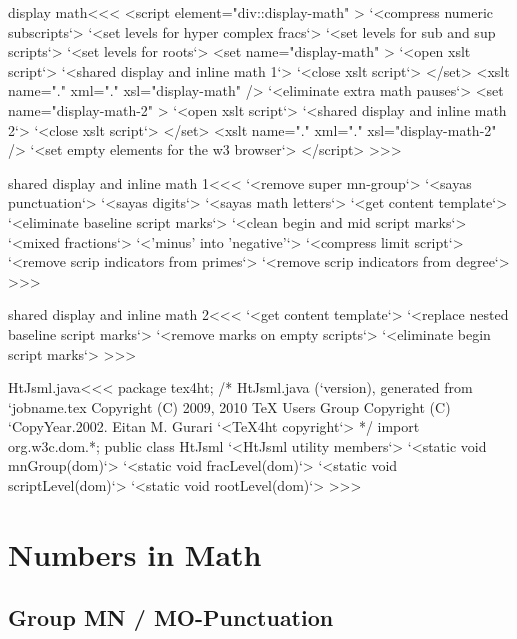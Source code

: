 \documentclass{article}
\begin{document}
\<display math\><<<
<script element="div::display-math" >
  `<compress numeric subscripts`>
  `<set levels for hyper complex fracs`>
  `<set levels for sub and sup scripts`>
  `<set levels for roots`>
  <set name="display-math" >
     `<open xslt script`>
     `<shared display and inline math 1`>
     `<close xslt script`>
  </set>
  <xslt name="." xml="." xsl="display-math" />
  `<eliminate extra math pauses`>
  <set name="display-math-2" >
     `<open xslt script`>
     `<shared display and inline math 2`>
     `<close xslt script`>
  </set>
  <xslt name="." xml="." xsl="display-math-2" />
  `<set empty elements for the w3 browser`>
</script> 
>>>




\<shared display and inline math 1\><<<
`<remove super mn-group`>
`<sayas punctuation`>
`<sayas digits`>
`<sayas math letters`>
`<get content template`>
`<eliminate baseline script marks`> 
`<clean begin and mid script marks`> 
`<mixed fractions`> 
`<'minus' into 'negative'`> 
`<compress limit script`>
`<remove scrip indicators from primes`> 
`<remove scrip indicators from degree`> 
>>>


\<shared display and inline math 2\><<<
`<get content template`>
`<replace nested baseline script marks`>
`<remove marks on empty scripts`>
`<eliminate begin script marks`> 
>>>






\<HtJsml.java\><<<
package tex4ht;
/* HtJsml.java (`version), generated from `jobname.tex
   Copyright (C) 2009, 2010 TeX Users Group
   Copyright (C) `CopyYear.2002. Eitan M. Gurari
`<TeX4ht copyright`> */
import org.w3c.dom.*;
public class HtJsml {
  `<HtJsml utility members`>
  `<static void mnGroup(dom)`>
  `<static void fracLevel(dom)`>
  `<static void scriptLevel(dom)`>
  `<static void rootLevel(dom)`>
}
>>>




\section{Numbers in Math}


\subsection{Group MN / MO-Punctuation}
\end{document}
